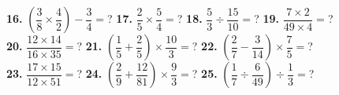 \documentclass[a4paper]{article}
\newcommand{\lr}[1]{\left({#1}\right)} %
\begin{document}
\begin{Large}
\textbf{16.} $\lr{\dfrac{3}{8} \times \dfrac{4}{2}} - \dfrac{3}{4}=$? \hspace{0.3cm}
\textbf{17.} $\dfrac{2}{5} \times \dfrac{5}{4}=$? \hspace{0.3cm}
\textbf{18.} $\dfrac{5}{3} \div \dfrac{15}{10}=$? \hspace{0.3cm}
\textbf{19.} $\dfrac{7 \times 2}{49 \times 4}=$? \\[0.75cm]
\textbf{20.} $\dfrac{12 \times 14}{16 \times 35}=$? \hspace{0.3cm}
\textbf{21.} $\lr{\dfrac{1}{5} + \dfrac{2}{5}} \times \dfrac{10}{3}=$? \hspace{0.3cm}
\textbf{22.} $\lr{\dfrac{2}{7} - \dfrac{3}{14}} \times \dfrac{7}{5}=$? \\[0.75cm]
\textbf{23.} $\dfrac{17 \times 15}{12 \times 51}=$?  \hspace{0.3cm}
\textbf{24.} $\lr{\dfrac{2}{9} + \dfrac{12}{81}} \times \dfrac{9}{3}=$? \hspace{0.3cm}
\textbf{25.} $\lr{\dfrac{1}{7} \div \dfrac{6}{49}} \div \dfrac{1}{3}=$? 

\end{Large}
\end{document}
